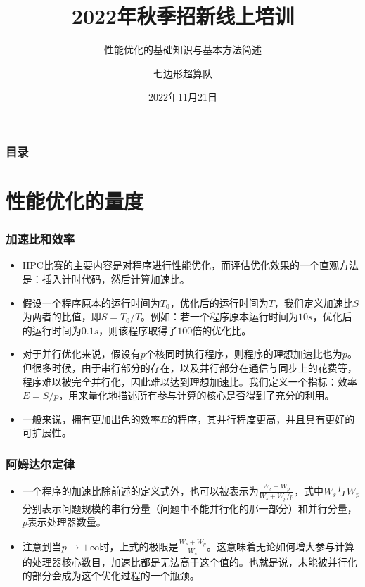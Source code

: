 \documentclass{beamer}
\title{2022年秋季招新线上培训}
\subtitle{性能优化的基础知识与基本方法简述}
\author{七边形超算队}
\institute{华中科技大学}
\date{2022年11月21日}
\begin{document}
\frame{\titlepage}

\begin{frame}
\frametitle{目录}
\tableofcontents
\end{frame}


\section{性能优化的量度}

\begin{frame}
\frametitle{加速比和效率}

\begin{itemize}
    \item<1-> HPC比赛的主要内容是对程序进行性能优化，而评估优化效果的一个直观方法是：插入计时代码，然后计算加速比。
    \item<2-> 假设一个程序原本的运行时间为$T_0$，优化后的运行时间为$T$，我们定义加速比$S$为两者的比值，即$S=T_0/T$。例如：若一个程序原本运行时间为$10s$，优化后的运行时间为$0.1s$，则该程序取得了$100$倍的优化比。
    \item<3-> 对于并行优化来说，假设有$p$个核同时执行程序，则程序的理想加速比也为$p$。但很多时候，由于串行部分的存在，以及并行部分在通信与同步上的花费等，程序难以被完全并行化，因此难以达到理想加速比。我们定义一个指标：效率$E=S/p$，用来量化地描述所有参与计算的核心是否得到了充分的利用。
    \item<4-> 一般来说，拥有更加出色的效率$E$的程序，其并行程度更高，并且具有更好的可扩展性。
\end{itemize}

\end{frame}

\begin{frame}
\frametitle{阿姆达尔定律}
\begin{itemize}
    \item<1-> 一个程序的加速比除前述的定义式外，也可以被表示为$\frac{W_s+W_p}{W_s+W_p/p}$，式中$W_s$与$W_p$分别表示问题规模的串行分量（问题中不能并行化的那一部分）和并行分量，$p$表示处理器数量。
    \item<2-> 注意到当$p→+∞$时，上式的极限是$\frac{W_s+W_p}{W_s}$。这意味着无论如何增大参与计算的处理器核心数目，加速比都是无法高于这个值的。也就是说，未能被并行化的部分会成为这个优化过程的一个瓶颈。
\end{itemize}
\end{frame}
\end{document}
